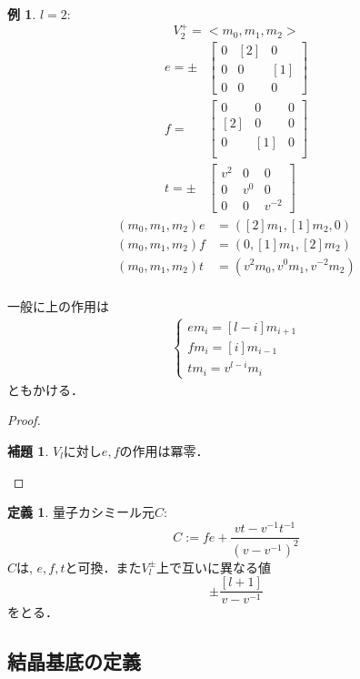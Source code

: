 \documentclass[dvipdfmx,autodetect-engine]{article}
\theoremstyle{definition}
\newtheorem{Def}{定義}
\newtheorem{Ex}{例}
\newtheorem{Lem}{補題}
\begin{document}
    \begin{Ex}
       $l = 2$:
       \[
            V_2^{+} = <m_0, m_1, m_2>
       \]
       \begin{align*}
           e = \pm
                &\begin{bmatrix}
                    0 & [2] & 0\\
                    0 &  0  & [1]\\
                    0 &  0  & 0 
                \end{bmatrix}\\
            f = 
                &\begin{bmatrix}
                    0 & 0 & 0\\
                    [2] &0&0\\
                     0 & [1] & 0\\
                \end{bmatrix}\\
            t = \pm
                &\begin{bmatrix}
                    v^{2} & 0 &0  \\
                    0 & v^{0} & 0\\
                    0  & 0 & v^{-2} 
                \end{bmatrix}
        \end{align*}
        \begin{align*}
            (m_0, m_1, m_2)e &= ([2]m_1, [1]m_2, 0)\\
            (m_0, m_1, m_2)f &= (0, [1]m_1, [2]m_2)\\
            (m_0, m_1, m_2)t &= (v^2m_0, v^0m_1, v^{-2}m_2)\\
        \end{align*}
    \end{Ex}
    一般に上の作用は
    \begin{align*}
        \begin{cases}
            em_i = [l-i]m_{i+1}\\
            fm_i = [i]m_{i-1}\\
            tm_i = v^{l-i}m_i
        \end{cases}
    \end{align*}
    ともかける．
    \begin{proof}
        \begin{Lem}
            $V_l$に対し$e,f$の作用は冪零．
        \end{Lem}
    \end{proof}
    
    \begin{Def}
        量子カシミール元$C$:
        \[
            C := fe + \frac{vt - v^{-1}t^{-1}}{(v - v^{-1})^2}
        \]
        $C$は, $e, f, t$と可換．また$V_{l}^{\pm}$上で互いに異なる値
        \[
            \pm \frac{[l+1]}{v - v^{-1}}
        \]
        をとる．
    \end{Def}
\subsection{結晶基底の定義}
\end{document}
